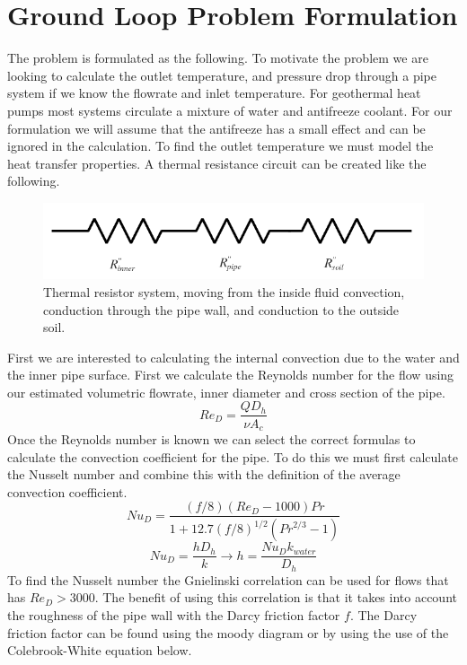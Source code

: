 \section{Ground Loop Problem Formulation}
The problem is formulated as the following. To motivate the problem we are looking to calculate the outlet temperature, and pressure drop through a pipe system if we know the flowrate and inlet temperature. For geothermal heat pumps most systems circulate a mixture of water and antifreeze coolant. For our formulation we will assume that the antifreeze has a small effect and can be ignored in the calculation. To find the outlet temperature we must model the heat transfer properties. A thermal resistance circuit can be created like the following.
%
\begin{figure}[H]
    \centering
    \includegraphics[width=6in]{pictures/Thermal_Resistors.png}
    \caption{Thermal resistor system, moving from the inside fluid convection, conduction through the pipe wall, and conduction to the outside soil.}
\end{figure}
%
\noindent
First we are interested to calculating the internal convection due to the water and the inner pipe surface. First we calculate the Reynolds number for the flow using our estimated volumetric flowrate, inner diameter and cross section of the pipe.
%
\begin{equation}
    { Re }_{ D }=\frac { Q{ D }_{ h } }{ \nu { A }_{ c } } 
\end{equation}
%
Once the Reynolds number is known we can select the correct formulas to calculate the convection coefficient for the pipe. To do this we must first calculate the Nusselt number and combine this with the definition of the average convection coefficient.
%
\begin{equation}
    { N }u_{ D }=\frac { \left( f/8 \right) \left( { Re }_{ D }-1000 \right) Pr }{ 1+12.7(f/8)^{ 1/2 }\left( { Pr }^{ 2/3 }-1 \right)  } 
\end{equation}
%
\begin{equation}
    { N }u_{ D }=\frac { h{ D }_{ h } }{ k } \rightarrow h=\frac { { N }u_{ D }{k}_{water} }{ { D }_{ h } } 
\end{equation}
%
To find the Nusselt number the Gnielinski correlation can be used for flows that has ${ Re }_{ D } > 3000$. The benefit of using this correlation is that it takes into account the roughness of the pipe wall with the Darcy friction factor $f$. The Darcy friction factor can be found using the moody diagram or by using the use of the Colebrook-White equation below.
